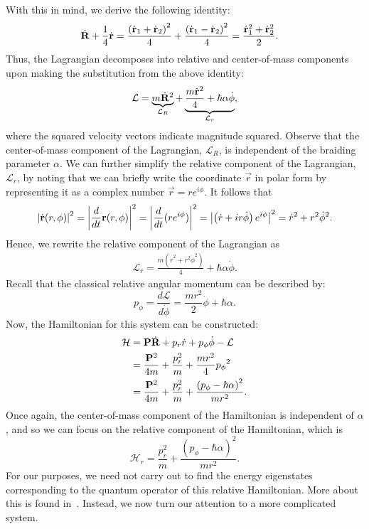 With this in mind, we derive the following identity:
\begin{align}
    \dot{\mathbf{R}} + \frac{1}{4}\dot{\mathbf{r}} &= \frac{{\left( \dot{\mathbf{r}}_1 + \dot{\mathbf{r}}_2 \right)}^2}{4} + \frac{{\left( \dot{\mathbf{r}}_1 - \dot{\mathbf{r}}_2 \right)}^2}{4} = \frac{{\dot{\mathbf{r}}_1}^2 + {\dot{\mathbf{r}}_2}^2}{2}.
\end{align}
Thus, the Lagrangian decomposes into relative and center-of-mass components upon making the substitution from the above identity:
\begin{align}
    \mathcal{L} = \underbrace{m\dot{\mathbf{R}}^2}_{\mathcal{L}_R} + \underbrace{\frac{m{\dot{\mathbf{r}}}^{2}}{4} + \hbar\alpha\dot{\phi}}_{\mathcal{L}_r},
\end{align}
where the squared velocity vectors indicate magnitude squared. Observe that the center-of-mass component of the Lagrangian, $\mathcal{L}_R$, is independent of the braiding parameter $\alpha$. We can further simplify the relative component of the Lagrangian, $\mathcal{L}_r$, by noting that we can briefly write the coordinate $\vec{r}$ in polar form by representing it as a complex number $\vec{r} =r e^{i\phi}$. It follows that
\begin{align}
    \left|\dot{\mathbf{r}}(r,\phi)\right|^2 = \left|\frac{d}{dt}\mathbf{r}(r,\phi)\right|^2 = \left|\frac{d}{dt}(r e^{i\phi})\right|^2 = \left|\left( \dot{r} + ir\dot{\phi} \right)e^{i\phi}\right|^2 = \dot{r}^2 + r^2\dot{\phi}^2.
\end{align}
Hence, we rewrite the relative component of the Lagrangian as
\begin{align}
    \mathcal{L}_r = \frac{m\left( \dot{r}^2 + r^2\dot{\phi}^2 \right)}{4} + \hbar\alpha\dot{\phi}.\label{eq:basic_Lr}
\end{align}
Recall that the classical relative angular momentum can be described by:
\begin{equation}
    p_\phi = \frac{d\mathcal{L}}{d\dot{\phi}} = \frac{mr^2}{2}\dot{\phi} + \hbar\alpha.
\end{equation}
Now, the Hamiltonian for this system can be constructed:
\begin{align}
    \begin{split}        
    \mathcal{H} 
    &= \mathbf{P}\dot{\mathbf{R}} + p_r\dot{r} + p_\phi\dot{\phi} - \mathcal{L} \\
    &= \frac{\mathbf{P}^2}{4m} + \frac{p_r^{2}}{m} + \frac{mr^2}{4} {p_\phi}^2 \\
    &= \frac{\mathbf{P}^2}{4m} + \frac{p_r^{2}}{m} + \frac{{\left( p_\phi - \hbar\alpha \right)}^2}{mr^2}.
    \end{split}
\end{align}
Once again, the center-of-mass component of the Hamiltonian is independent of $\alpha$, and so we can focus on the relative component of the Hamiltonian, which is
\begin{equation}
    \mathcal{H}_r = \frac{p_r^{2}}{m} + \frac{{\left( p_\phi - \hbar\alpha \right)}^2}{mr^2}.\label{eq:basic_Hr}
\end{equation}
For our purposes, we need not carry out to find the energy eigenstates corresponding to the quantum operator of this relative Hamiltonian. More about this is found in~\cite{Khare2005}. Instead, we now turn our attention to a more complicated system.


